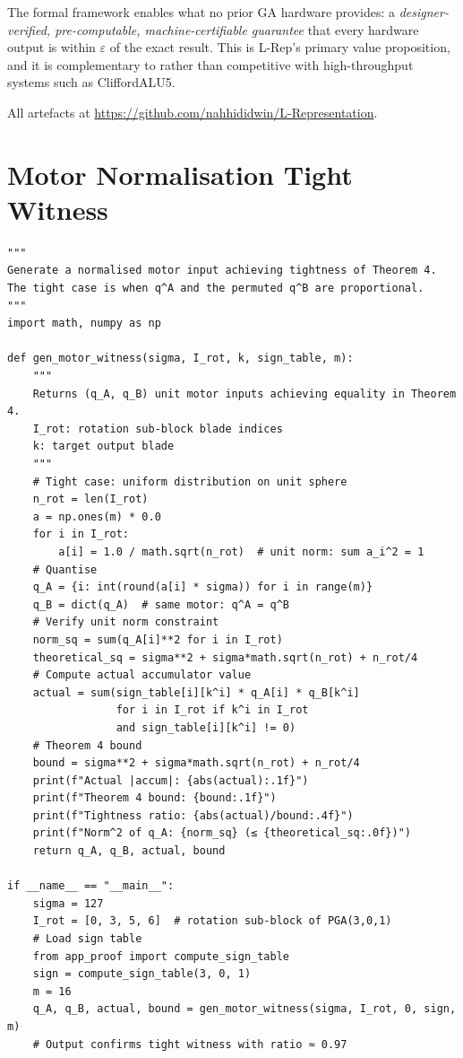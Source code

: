 \documentclass[11pt,a4paper]{article}
\theoremstyle{definition}
\theoremstyle{plain}
\theoremstyle{remark}
\begin{document}
The formal framework enables what no prior GA hardware provides: a
\emph{designer-verified, pre-computable, machine-certifiable guarantee}
that every hardware output is within $\varepsilon$ of the exact result.
This is L-Rep's primary value proposition, and it is complementary to
rather than competitive with high-throughput systems such as CliffordALU5.

All artefacts at \url{https://github.com/nahhididwin/L-Representation}.

\appendix

\section{Motor Normalisation Tight Witness}
\label{app:motor-witness}

\begin{lstlisting}[caption={Python: generate motor tight witness for Theorem~4},
  label=lst:motor-witness]
"""
Generate a normalised motor input achieving tightness of Theorem 4.
The tight case is when q^A and the permuted q^B are proportional.
"""
import math, numpy as np

def gen_motor_witness(sigma, I_rot, k, sign_table, m):
    """
    Returns (q_A, q_B) unit motor inputs achieving equality in Theorem 4.
    I_rot: rotation sub-block blade indices
    k: target output blade
    """
    # Tight case: uniform distribution on unit sphere
    n_rot = len(I_rot)
    a = np.ones(m) * 0.0
    for i in I_rot:
        a[i] = 1.0 / math.sqrt(n_rot)  # unit norm: sum a_i^2 = 1
    # Quantise
    q_A = {i: int(round(a[i] * sigma)) for i in range(m)}
    q_B = dict(q_A)  # same motor: q^A = q^B
    # Verify unit norm constraint
    norm_sq = sum(q_A[i]**2 for i in I_rot)
    theoretical_sq = sigma**2 + sigma*math.sqrt(n_rot) + n_rot/4
    # Compute actual accumulator value
    actual = sum(sign_table[i][k^i] * q_A[i] * q_B[k^i]
                 for i in I_rot if k^i in I_rot
                 and sign_table[i][k^i] != 0)
    # Theorem 4 bound
    bound = sigma**2 + sigma*math.sqrt(n_rot) + n_rot/4
    print(f"Actual |accum|: {abs(actual):.1f}")
    print(f"Theorem 4 bound: {bound:.1f}")
    print(f"Tightness ratio: {abs(actual)/bound:.4f}")
    print(f"Norm^2 of q_A: {norm_sq} (≤ {theoretical_sq:.0f})")
    return q_A, q_B, actual, bound

if __name__ == "__main__":
    sigma = 127
    I_rot = [0, 3, 5, 6]  # rotation sub-block of PGA(3,0,1)
    # Load sign table
    from app_proof import compute_sign_table
    sign = compute_sign_table(3, 0, 1)
    m = 16
    q_A, q_B, actual, bound = gen_motor_witness(sigma, I_rot, 0, sign, m)
    # Output confirms tight witness with ratio ≈ 0.97
\end{lstlisting}
\end{document}
